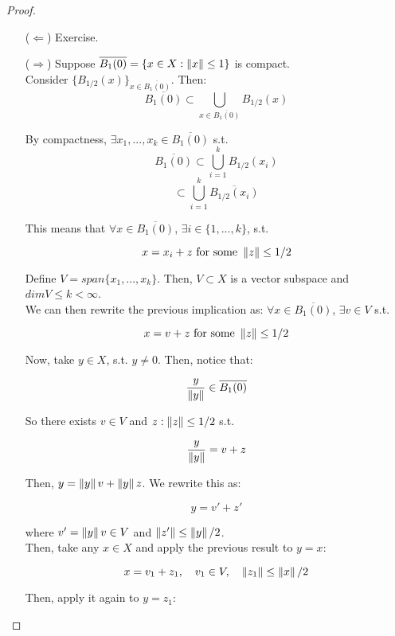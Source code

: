 \begin{proof}
    \begin{itemize}
        \item[($\Leftarrow$)] Exercise.
        \item[($\Rightarrow$)] Suppose $\overline{B_1(0)} = \{x \in X: \left\|x\right\| \leq 1\}$ is compact.\\
        
        Consider $\{ B_{1/2}(x) \}_{x \in \overline{B_1(0)}}$.
        Then:
        $$\overline{B_1(0)} \subset \bigcup_{x \in \overline{B_1(0)}} B_{1/2}(x)$$

        By compactness, $\exists x_1, ..., x_k \in \overline{B_1(0)}$ s.t.
        $$\overline{B_1(0)} \subset \bigcup_{i=1}^k B_{1/2}(x_i)$$
        $$\subset \bigcup_{i=1}^k \overline{B_{1/2}(x_i)}$$

        This means that $\forall x \in \overline{B_1(0)}$, $\exists i \in \{1, ..., k\}$, s.t.

        $$x = x_i + z \text{ for some } \left\|z\right\| \leq 1/2$$

        Define $V = span\{x_1, ..., x_k\}$. Then, $V \subset X$ is a vector subspace
        and $dim V \leq k < \infty$.\\
        
        We can then rewrite the previous implication as: $\forall x \in \overline{B_1(0)}$, $\exists v \in V$ s.t.

        $$x = v + z \text{ for some } \left\|z\right\| \leq 1/2$$

        Now, take $y \in X$, s.t. $y \neq 0$. Then, notice that:

        $$\frac{y}{\left\|y\right\|} \in \overline{B_1(0)}$$

        So there exists $v \in V$ and $z: \left\|z\right\| \leq 1/2$ s.t.

        $$\frac{y}{\left\|y\right\|} = v + z$$

        Then, $y = \left\|y\right\|v + \left\|y\right\|z$. We rewrite this as:

        $$y = v' + z'$$

        where $v' = \left\|y\right\|v \in V$ and $\left\|z'\right\| \leq \left\|y\right\|/2$.\\

        Then, take any $x \in X$ and apply the previous result to $y = x$:

        $$x = v_1 + z_1, \quad v_1 \in V, \quad \left\|z_1\right\| \leq \left\|x\right\|/2$$

        Then, apply it again to $y = z_1$:


\end{itemize}
\end{proof}
